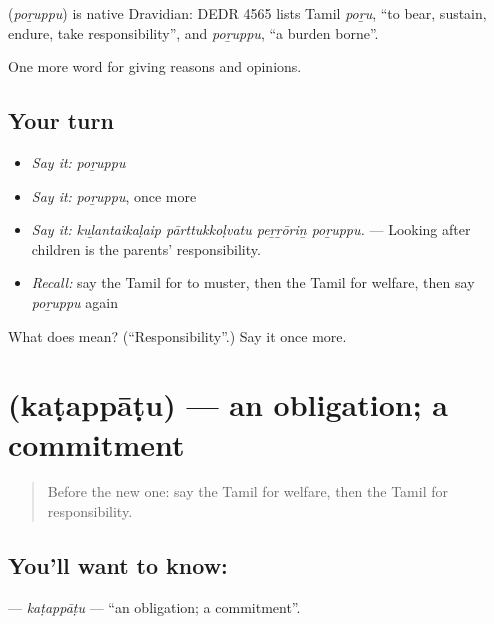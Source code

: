 \begin{cousinweb}
\textbf{} (\emph{poṟuppu}) is native Dravidian: DEDR 4565 lists Tamil \emph{poṟu}, \textquotedblleft{}to bear, sustain, endure, take responsibility\textquotedblright{}, and \emph{poṟuppu}, \textquotedblleft{}a burden borne\textquotedblright{}.
\end{cousinweb}

\begin{grammarlens}[title={What you've built}]
One more word for giving reasons and opinions.
\end{grammarlens}

\subsection*{Your turn}
\begin{itemize}
\raggedright
  \item \emph{Say it:} \emph{poṟuppu}
  \item \emph{Say it:} \emph{poṟuppu}, once more
  \item \emph{Say it:} \emph{kuḻantaikaḷaip pārttukkoḷvatu peṟṟōriṉ poṟuppu.} — Looking after children is the parents' responsibility.
  \item \emph{Recall:} say the Tamil for to muster, then the Tamil for welfare, then say \emph{poṟuppu} again
\end{itemize}

\begin{tcolorbox}[breakable,colback=teal!4,colframe=teal!35!black,title={Before you move on}]
What does  mean? (\textquotedblleft{}Responsibility\textquotedblright{}.) Say it once more.
\end{tcolorbox}
\section[\texorpdfstring{\ta{கடப்பாடு} (kaṭappāṭu)}{கடப்பாடு (kaṭappāṭu)}]{ (kaṭappāṭu) — an obligation; a commitment}

\label{lesson:TA-C380-katappatu}



\begin{quote}
Before the new one: say the Tamil for welfare, then the Tamil for responsibility.
\end{quote}

\subsection*{You'll want to know: }
\textbf{} — \emph{kaṭappāṭu} — \textquotedblleft{}an obligation; a commitment\textquotedblright{}.

